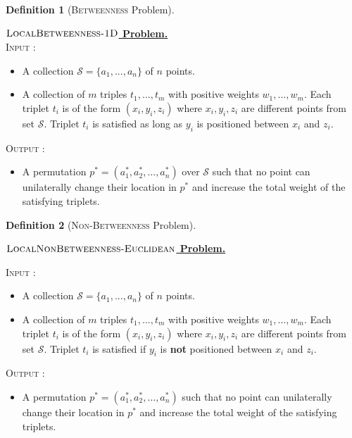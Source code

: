 \documentclass{article}
\theoremstyle{definition}  %
\theoremstyle{plain}
\newtheorem{definition}{Definition}
\numberwithin{observation}{section}
\numberwithin{claim}{section}
\numberwithin{fact}{section}
\numberwithin{lemma}{section}
\numberwithin{proposition}{section}
\numberwithin{theorem}{section}
\numberwithin{corollary}{section}
\numberwithin{definition}{section}
\newcommand{\calS}{\ensuremath{\mathcal{S}}}
\newenvironment{nproblem}[1][\unskip]{%
  \medskip
  \begin{mdframed}
  \noindent
  \textbf{\underline{$#1$ Problem.}} \\
  \noindent
}{%
  \end{mdframed}
  \medskip %
}
\newcommand{\betweeness}{\textsc{LocalBetweenness-1D}}
\newcommand{\nbtw}{\textsc{LocalNonBetweenness-Euclidean}}
\theoremstyle{plain}
\begin{document}
\begin{definition}[\textsc{Betweenness} Problem]
\end{definition}
\begin{nproblem}[\betweeness] \label{def:betweenness}
 \textsc{Input :}  \begin{itemize}
   \vspace{-0.1in}
   \item A collection $\calS = \{a_1,...,a_n\} $ of $n$ points.
   \item A collection of $m$ triples $t_1,...,t_m$ with positive weights $w_1,...,w_m$. Each triplet $t_i$ is of the form $(x_i,y_i, z_i)$ where $x_i, y_i, z_i$ are different points from set $\calS$. Triplet $t_i$ is satisfied as long as $y_i$ is positioned between $x_i$ and $z_i.$ 
\end{itemize}
  \vspace{-0.1in}
  \noindent \textsc{Output :} \begin{itemize}[label = ]
      \vspace{-0.1in}
      \item A permutation $p^* = (a_1^*, a_2^*, \dots, a_n^*)$ over $\calS$ such that no point can unilaterally change their location in $p^*$ and increase the total weight of the satisfying triplets. 
  \end{itemize}
\end{nproblem}

\begin{definition}[\textsc{Non-Betweenness} Problem]
\end{definition}

\begin{nproblem}[\nbtw]
    \textsc{Input :}  \begin{itemize}
    \vspace{-0.1in}
   \item A collection $\calS = \{a_1,...,a_n\} $ of $n$ points.
   \item A collection of $m$ triples $t_1,...,t_m$ with positive weights $w_1,...,w_m$. Each triplet $t_i$ is of the form $(x_i,y_i, z_i)$ where $x_i, y_i, z_i$ are different points from set $\calS$. Triplet $t_i$ is satisfied if $y_i$ is \textbf{not} positioned between $x_i$ and $z_i.$ 
\end{itemize}
    \vspace{-0.1in}
  \noindent \textsc{Output :} \begin{itemize}[label = ]
      \vspace{-0.1in}
      \item A permutation $p^* = (a_1^*, a_2^*, \dots, a_n^*)$ such that no point can unilaterally change their location in $p^*$ and increase the total weight of the satisfying triplets. 
      \end{itemize}
\end{nproblem}
\end{document}
